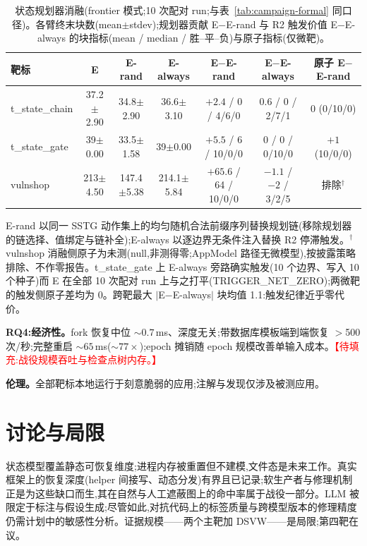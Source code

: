 \documentclass[letterpaper,twocolumn,10pt]{article}
\newcommand{\planned}[1]{\textcolor{red}{【待填充:#1】}}
\begin{document}
\begin{table}[t]
\centering
\small
\caption{状态规划器消融(frontier 模式;10 次配对 run;与表~\ref{tab:campaign-formal} 同口径)。各臂终末块数(mean$\pm$stdev);规划器贡献 E$-$E-rand 与 R2 触发价值 E$-$E-always 的块指标(mean / median / 胜--平--负)与原子指标(仅微靶)。}
\label{tab:ablation-formal}
\begin{tabular}{lcccccc}
\hline
靶标 & E & E-rand & E-always & E$-$E-rand & E$-$E-always & 原子 E$-$E-rand \\
\hline
t\_state\_chain & 37.2$\pm$2.90 & 34.8$\pm$2.90 & 36.6$\pm$3.10 & $+2.4$ / 0 / 4/6/0 & $0.6$ / $0$ / 2/7/1 & $0$ (0/10/0) \\
t\_state\_gate & 39$\pm$0.00 & 33.5$\pm$1.58 & 39$\pm$0.00 & $+5.5$ / 6 / 10/0/0 & $0$ / $0$ / 0/10/0 & $+1$ (10/0/0) \\
vulnshop & 213$\pm$4.50 & 147.4$\pm$5.38 & 214.1$\pm$5.84 & $+65.6$ / 64 / 10/0/0 & $-1.1$ / $-2$ / 3/2/5 & 排除$^{\dagger}$ \\
\hline
\end{tabular}

\begin{minipage}{\textwidth}
\footnotesize
E-rand 以同一 SSTG 动作集上的均匀随机合法前缀序列替换规划链(移除规划器的链选择、值绑定与链补全);E-always 以逐边界无条件注入替换 R2 停滞触发。$^{\dagger}$vulnshop 消融侧原子为未测(null,非测得零;AppModel 路径无微模型),按披露策略排除、不作零报告。t\_state\_gate 上 E-always 旁路确实触发(10 个边界、写入 10 个种子)而 E 在全部 10 次配对 run 上与之打平(TRIGGER\_NET\_ZERO);两微靶的触发侧原子差均为 0。跨靶最大 $|$E$-$E-always$|$ 块均值 1.1:触发纪律近乎零代价。
\end{minipage}
\end{table}


\textbf{RQ4:经济性。}fork 恢复中位 ${\sim}0.7$\,ms、深度无关;带数据库模板端到端恢复 $>$500 次/秒;完整重启 ${\sim}65$\,ms(${\sim}77\times$);epoch 摊销随 epoch 规模改善单输入成本。\planned{战役规模吞吐与检查点树内存。} %

\textbf{伦理。}全部靶标本地运行于刻意脆弱的应用;注解与发现仅涉及被测应用。

\section{讨论与局限}
\label{sec:discussion}
状态模型覆盖静态可恢复维度;进程内存被重置但不建模,文件态是未来工作。真实框架上的恢复深度(helper 间接写、动态分发)有界且已记录;软生产者与修理机制正是为这些缺口而生,其在自然与人工遮蔽图上的命中率属于战役一部分。LLM 被限定于标注与假设生成;尽管如此,对抗代码上的标签质量与跨模型版本的修理精度仍需计划中的敏感性分析。证据规模——两个主靶加 DSVW——是局限;第四靶在议。
\end{document}
